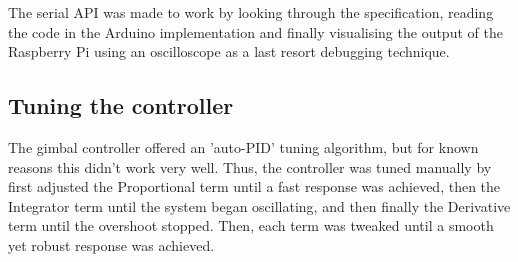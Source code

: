 The serial API was made to work by looking through the specification, reading the code in the Arduino implementation and finally visualising the output of the Raspberry Pi using an oscilloscope as a last resort debugging technique.

\subsection{Tuning the controller}
The gimbal controller offered an 'auto-PID' tuning algorithm, but for known reasons this didn't work very well. Thus, the controller was tuned manually by first adjusted the Proportional term until a fast response was achieved, then the Integrator term until the system began oscillating, and then finally the Derivative term until the overshoot stopped. Then, each term was tweaked until a smooth yet robust response was achieved.


